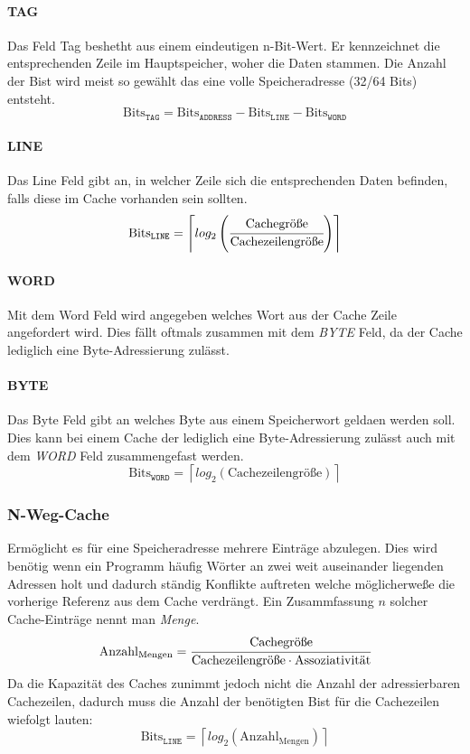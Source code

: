 \paragraph{TAG}
Das Feld Tag beshetht aus einem eindeutigen n-Bit-Wert. Er kennzeichnet die entsprechenden
Zeile im Hauptspeicher, woher die Daten stammen. Die Anzahl der Bist wird meist so gewählt
das eine volle Speicheradresse (32/64 Bits) entsteht.
\[
 \text{Bits}_\texttt{TAG} = \text{Bits}_\texttt{ADDRESS} - \text{Bits}_\texttt{LINE} - \text{Bits}_\texttt{WORD}
\]

\paragraph{LINE}
Das Line Feld gibt an, in welcher Zeile sich die entsprechenden Daten befinden, falls diese im Cache
vorhanden sein sollten.
\[
 \text{Bits}_\texttt{LINE} = \left\lceil log_{2}\left(\cfrac{\text{Cachegröße}}{\text{Cachezeilengröße}}\right) \right\rceil
\]

\paragraph{WORD}
Mit dem Word Feld wird angegeben welches Wort aus der Cache Zeile angefordert wird. Dies fällt oftmals
zusammen mit dem \emph{BYTE} Feld, da der Cache lediglich eine Byte-Adressierung zulässt.

\paragraph{BYTE}
Das Byte Feld gibt an welches Byte aus einem Speicherwort geldaen werden soll. Dies kann bei einem Cache
der lediglich eine Byte-Adressierung zulässt auch mit dem \emph{WORD} Feld zusammengefast werden.
\[
 \text{Bits}_\texttt{WORD} = \left\lceil log_{2}\left(\text{Cachezeilengröße}\right) \right\rceil
\]

\subsubsection*{N-Weg-Cache}
Ermöglicht es für eine Speicheradresse mehrere Einträge abzulegen. Dies wird benötig wenn ein Programm
häufig Wörter an zwei weit auseinander liegenden Adressen holt und dadurch ständig Konflikte auftreten 
welche möglicherweße die vorherige Referenz aus dem Cache verdrängt. Ein Zusammfassung $n$ solcher 
Cache-Einträge nennt man \emph{Menge}.
\[
 \text{Anzahl}_\text{Mengen} = \cfrac{\text{Cachegröße}}{\text{Cachezeilengröße} \cdot \text{Assoziativität}}
\]
Da die Kapazität des Caches zunimmt jedoch nicht die Anzahl der adressierbaren Cachezeilen, dadurch muss
die Anzahl der benötigten Bist für die Cachezeilen wiefolgt lauten: 
\[
 \text{Bits}_\texttt{LINE} = \left\lceil log_{2}\left( \text{Anzahl}_\text{Mengen} \right) \right\rceil
\]


